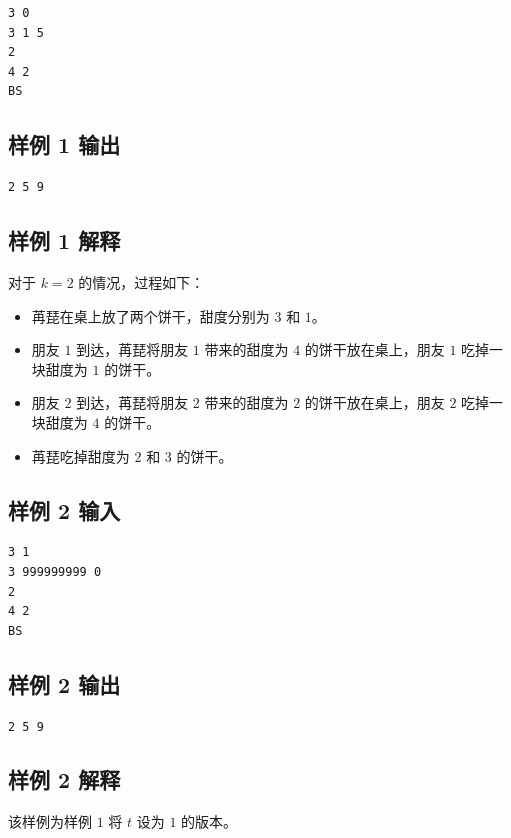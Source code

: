 \documentclass[12pt]{article}                               %
\begin{document}
\begin{lstlisting}
3 0
3 1 5
2
4 2
BS
\end{lstlisting}

	\subsection{样例 1 输出}

\begin{lstlisting}
2 5 9
\end{lstlisting}

	\subsection{样例 1 解释}

	对于 $k=2$ 的情况，过程如下：

	\begin{itemize}
		\item 苒琵在桌上放了两个饼干，甜度分别为 $3$ 和 $1$。
		\item 朋友 $1$ 到达，苒琵将朋友 $1$ 带来的甜度为 $4$ 的饼干放在桌上，朋友 $1$ 吃掉一块甜度为 $1$ 的饼干。
		\item 朋友 $2$ 到达，苒琵将朋友 $2$ 带来的甜度为 $2$ 的饼干放在桌上，朋友 $2$ 吃掉一块甜度为 $4$ 的饼干。
		\item 苒琵吃掉甜度为 $2$ 和 $3$ 的饼干。
	\end{itemize}

	\subsection{样例 2 输入}

\begin{lstlisting}
3 1
3 999999999 0
2
4 2
BS
\end{lstlisting}

	\subsection{样例 2 输出}

\begin{lstlisting}
2 5 9
\end{lstlisting}

	\subsection{样例 2 解释}

	该样例为样例 $1$ 将 $t$ 设为 $1$ 的版本。
\end{document}

